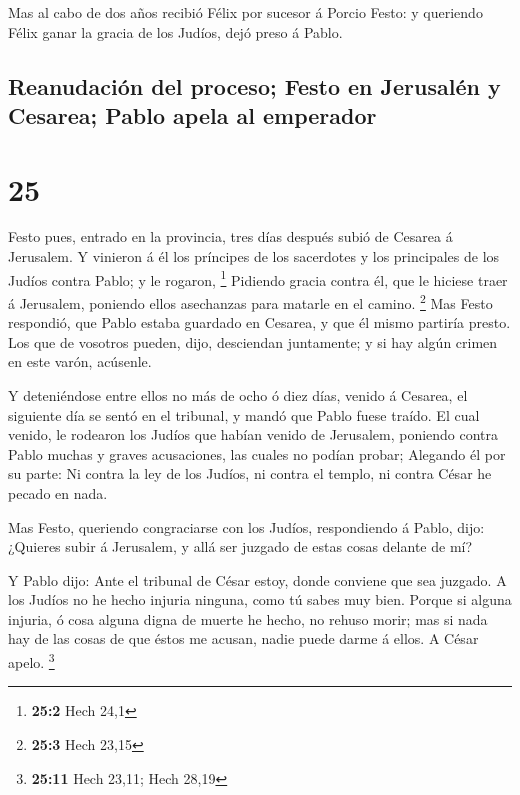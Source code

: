  Mas al cabo de dos años recibió Félix por sucesor á
Porcio Festo: y queriendo Félix ganar la gracia de los Judíos, dejó
preso á Pablo.

\hypertarget{reanudaciuxf3n-del-proceso-festo-en-jerusaluxe9n-y-cesarea-pablo-apela-al-emperador}{%
\subsection{Reanudación del proceso; Festo en Jerusalén y Cesarea; Pablo
apela al
emperador}\label{reanudaciuxf3n-del-proceso-festo-en-jerusaluxe9n-y-cesarea-pablo-apela-al-emperador}}

\hypertarget{section-24}{%
\section{25}\label{section-24}}

 Festo pues, entrado en la provincia, tres días después
subió de Cesarea á Jerusalem.  Y vinieron á él los
príncipes de los sacerdotes y los principales de los Judíos contra
Pablo; y le rogaron, \footnote{\textbf{25:2} Hech 24,1} 
Pidiendo gracia contra él, que le hiciese traer á Jerusalem, poniendo
ellos asechanzas para matarle en el camino. \footnote{\textbf{25:3} Hech
  23,15}  Mas Festo respondió, que Pablo estaba guardado
en Cesarea, y que él mismo partiría presto.  Los que de
vosotros pueden, dijo, desciendan juntamente; y si hay algún crimen en
este varón, acúsenle.

 Y deteniéndose entre ellos no más de ocho ó diez días,
venido á Cesarea, el siguiente día se sentó en el tribunal, y mandó que
Pablo fuese traído.  El cual venido, le rodearon los
Judíos que habían venido de Jerusalem, poniendo contra Pablo muchas y
graves acusaciones, las cuales no podían probar;  Alegando
él por su parte: Ni contra la ley de los Judíos, ni contra el templo, ni
contra César he pecado en nada.

 Mas Festo, queriendo congraciarse con los Judíos,
respondiendo á Pablo, dijo: ¿Quieres subir á Jerusalem, y allá ser
juzgado de estas cosas delante de mí?

 Y Pablo dijo: Ante el tribunal de César estoy, donde
conviene que sea juzgado. A los Judíos no he hecho injuria ninguna, como
tú sabes muy bien.  Porque si alguna injuria, ó cosa
alguna digna de muerte he hecho, no rehuso morir; mas si nada hay de las
cosas de que éstos me acusan, nadie puede darme á ellos. A César apelo.
\footnote{\textbf{25:11} Hech 23,11; Hech 28,19}

